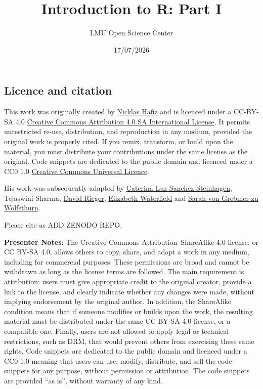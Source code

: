 \documentclass[
  letterpaper,
  DIV=11,
  numbers=noendperiod]{scrartcl}
\title{Introduction to R: Part I}
\author{LMU Open Science Center}
\date{17/07/2026}
\begin{document}
\maketitle


\subsection{Licence and citation}\label{licence-and-citation}

This work was originally created by
\href{https://orcid.org/0000-0001-9035-4483}{Nicklas Hafiz} and is
licenced under a CC-BY-SA 4.0
\href{https://creativecommons.org/licenses/by-sa/4.0/deed.en}{Creative
Commons Attribution 4.0 SA International License}. It permits
unrestricted re-use, distribution, and reproduction in any medium,
provided the original work is properly cited. If you remix, transform,
or build upon the material, you must distribute your contributions under
the same license as the original. Code snippets are dedicated to the
public domain and licenced under a CC0 1.0
\href{https://creativecommons.org/publicdomain/zero/1.0/}{Creative
Commons Universal Licence}.

His work was subsequently adapted by
\href{https://orcid.org/0009-0006-4783-1110}{Caterina Luz Sanchez
Steinhagen}, Tejaswini Sharma,
\href{https://orcid.org/0009-0004-3701-3101}{David Rieger},
\href{https://orcid.org/0009-0006-3725-6730}{Elizabeth Waterfield} and
\href{https://orcid.org/0000-0002-6413-3895}{Sarah von Grebmer zu
Wolfsthurn}.

Please cite as ADD ZENODO REPO.

\textbf{Presenter Notes}: The Creative Commons Attribution--ShareAlike
4.0 license, or CC BY-SA 4.0, allows others to copy, share, and adapt a
work in any medium, including for commercial purposes. These permissions
are broad and cannot be withdrawn as long as the license terms are
followed. The main requirement is attribution: users must give
appropriate credit to the original creator, provide a link to the
license, and clearly indicate whether any changes were made, without
implying endorsement by the original author. In addition, the ShareAlike
condition means that if someone modifies or builds upon the work, the
resulting material must be distributed under the same CC BY-SA 4.0
license, or a compatible one. Finally, users are not allowed to apply
legal or technical restrictions, such as DRM, that would prevent others
from exercising these same rights. Code snippets are dedicated to the
public domain and licenced under a CC0 1.0 meaning that users can use,
modify, distribute, and sell the code snippets for any purpose, without
permission or attribution. The code snippets are provided ``as is'',
without warranty of any kind.
\end{document}

